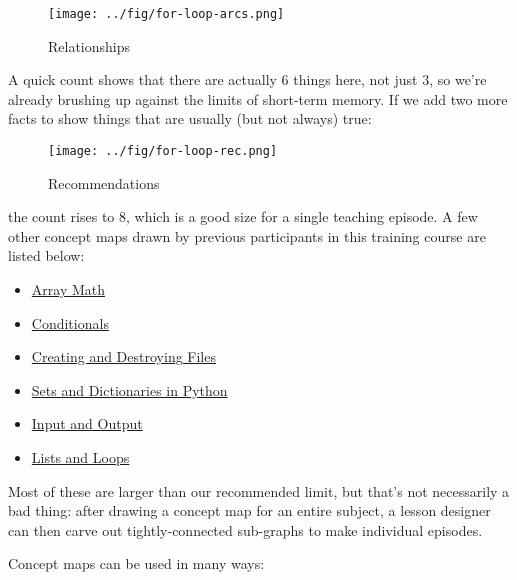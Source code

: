 \begin{figure}[htbp]
\centering
\texttt{[image: ../fig/for-loop-arcs.png]}
\caption{Relationships}
\end{figure}

A quick count shows that there are actually 6 things here, not just 3,
so we're already brushing up against the limits of short-term memory. If
we add two more facts to show things that are usually (but not always)
true:

\begin{figure}[htbp]
\centering
\texttt{[image: ../fig/for-loop-rec.png]}
\caption{Recommendations}
\end{figure}

the count rises to 8, which is a good size for a single teaching
episode. A few other concept maps drawn by previous participants in this
training course are listed below:

\begin{itemize}
\itemsep1pt\parskip0pt
\item
  \href{../fig/array-math.png}{Array Math}
\item
  \href{../fig/conditionals.png}{Conditionals}
\item
  \href{../fig/create-destroy.png}{Creating and Destroying Files}
\item
  \href{../fig/dict-set.png}{Sets and Dictionaries in Python}
\item
  \href{../fig/io.png}{Input and Output}
\item
  \href{../fig/lists-loops.png}{Lists and Loops}
\end{itemize}

Most of these are larger than our recommended limit, but that's not
necessarily a bad thing: after drawing a concept map for an entire
subject, a lesson designer can then carve out tightly-connected
sub-graphs to make individual episodes.

Concept maps can be used in many ways:

